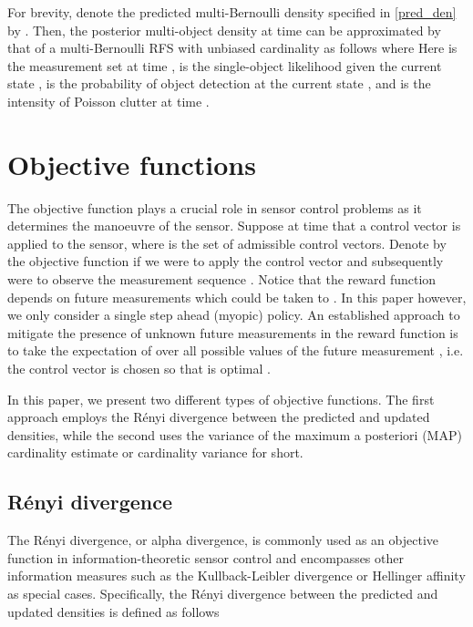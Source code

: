 \documentclass[twocolumn]{autart}
\begin{document}
For brevity, denote the predicted multi-Bernoulli density specified in \eqref{pred_den} by . Then, the posterior multi-object density at time  can be approximated by
that of a multi-Bernoulli RFS with unbiased cardinality as follows
where
Here  is the measurement set at time ,  is the single-object likelihood given the current state ,  is the probability of object detection at
the current state , and  is the intensity
of Poisson clutter at time .



\section{Objective functions}

The objective function plays a crucial role in sensor control problems as it determines the
manoeuvre of the sensor. Suppose at time  that a control vector 
is applied to the sensor, where  is the set of admissible
control vectors. Denote by  the
objective function if we were to apply the control vector  and
subsequently were to observe the measurement sequence .
Notice that the reward function depends on  future measurements which could be taken to . In this paper however, we only consider a single
step ahead (myopic) policy. An established approach to mitigate the presence
of unknown future measurements in the reward function is to take the
expectation of  over all possible
values of the future measurement , i.e. the control vector
 is chosen so that  is optimal \cite{Mah04,RV10,RVC11}.

In this paper, we present two different types of objective functions. The first approach employs the R\'{e}nyi divergence between the predicted and updated densities, while the second
uses the variance of the maximum a posteriori (MAP) cardinality estimate or
cardinality variance for short.

\subsection{R\'enyi divergence}

The R\'{e}nyi divergence, or alpha divergence, is commonly used as an objective
function in information-theoretic sensor control \cite{RV10,RVC11,HKB08} and encompasses other
information measures such as the Kullback-Leibler divergence or Hellinger
affinity as special cases. Specifically, the R\'{e}nyi divergence between
the predicted and updated densities is defined as follows \cite{HKB08}
\end{document}
